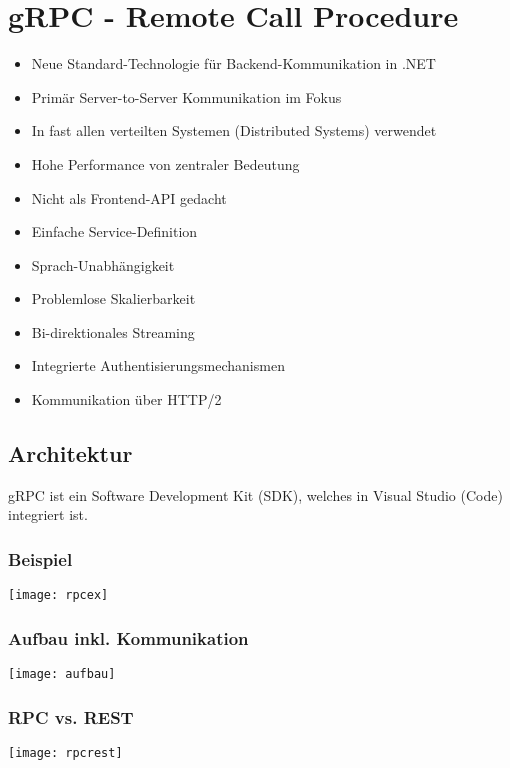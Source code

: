 \section{gRPC - Remote Call Procedure}
\begin{multicols*}{2}
    \begin{itemize}
        \item Neue Standard-Technologie für Backend-Kommunikation in .NET
        \item Primär Server-to-Server Kommunikation im Fokus
        \item In fast allen verteilten Systemen (Distributed Systems) verwendet
        \item Hohe Performance von zentraler Bedeutung
        \item Nicht als Frontend-API gedacht
    \end{itemize}
\begin{itemize}
    \item Einfache Service-Definition
    \item Sprach-Unabhängigkeit
    \item Problemlose Skalierbarkeit
    \item Bi-direktionales Streaming
    \item Integrierte Authentisierungsmechanismen
    \item Kommunikation über HTTP/2
\end{itemize}
\subsection{Architektur}
gRPC ist ein Software Development Kit (SDK), welches in Visual Studio (Code) integriert ist.
\subsubsection{Beispiel}
\texttt{[image: rpcex]}
\subsubsection{Aufbau inkl. Kommunikation}
\texttt{[image: aufbau]}
\subsubsection{RPC vs. REST}
\texttt{[image: rpcrest]}

\end{multicols*}
